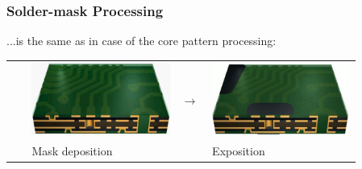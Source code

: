 \documentclass{beamer}
\begin{document}
	\begin{frame}
    \frametitle{Solder-mask Processing}
		...is the same as in case of the core pattern processing:
		\begin{center}
		
			\begin{tabular}{m{0.05\linewidth} m{0.38\linewidth} m{0.05\linewidth} m{0.38\linewidth}}
			 \Large & \includegraphics[scale=0.12]{obr17_maskaFilm.png} & \Large\textbf{$\rightarrow$} & \includegraphics[scale=0.12]{obr18_maskaExpozice.png}\\
			 & Mask deposition & & Exposition \\

\end{tabular}
\end{center}
\end{frame}
\end{document}
